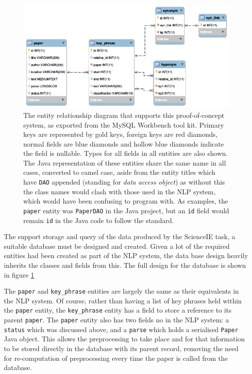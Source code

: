 \begin{figure}
	\includegraphics[width=\textwidth]{img/fypdberd.png}
	\caption[Database Entity Relationship Diagram]{The entity relationship diagram that supports this proof-of-concept system, as exported from the MySQL Workbench tool kit. Primary keys are represented by gold keys, foreign keys are red diamonds, normal fields are blue diamonds and hollow blue diamonds indicate the field is nullable. Types for all fields in all entities are also shown. The Java representation of these entities share the same name in all cases, converted to camel case, aside from the entity titles which have \texttt{DAO} appended (standing for \textit{data access object}) as without this the class names would clash with those used in the NLP system, which would have been confusing to program with. As examples, the \texttt{paper} entity was \texttt{PaperDAO} in the Java project, but an \texttt{id} field would remain \texttt{id} in the Java code to follow the standard.}
	\label{figure:dberd}
\end{figure}

The support storage and query of the data produced by the ScienceIE task, a suitable database must be designed and created. Given a lot of the required entities had been created as part of the NLP system, the data base design heavily inherits the classes and fields from this. The full design for the database is shown in figure \ref{figure:dberd}

The \texttt{paper} and \texttt{key\_phrase} entities are largely the same as their equivalents in the NLP system. Of course, rather than having a list of key phrases held within the \texttt{paper} entity, the \texttt{key\_phrase} entity has a field to store a reference to its parent \texttt{paper}. The \texttt{paper} entity also has two fields no in the NLP system: a \texttt{status} which was discussed above, and a \texttt{parse} which holds a serialised \texttt{Paper} Java object. This allows the preprocessing to take place and for that information to be stored directly in the database with its parent record, removing the need for re-computation of preprocessing every time the paper is called from the database.

